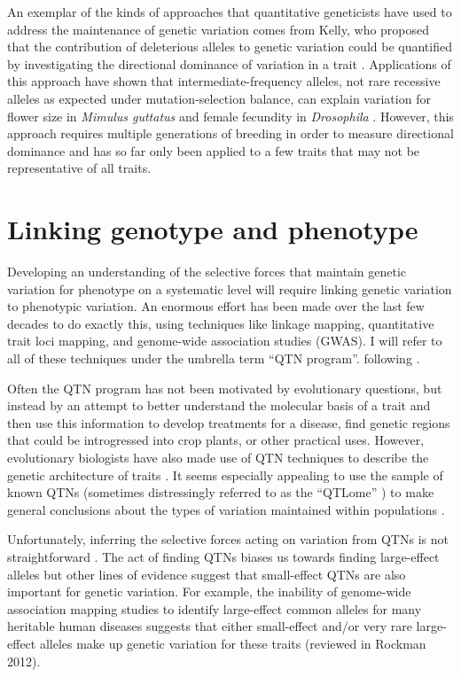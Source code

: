 An exemplar of the kinds of approaches that quantitative geneticists have used to address the maintenance of genetic variation comes from Kelly, who proposed that the contribution of deleterious alleles to genetic variation could be quantified by investigating the directional dominance of variation in a trait \citep{Kelly1999-re}. Applications of this approach have shown that intermediate-frequency alleles, not rare recessive alleles as expected under mutation-selection balance, can explain variation for flower size in \textit{Mimulus guttatus} and female fecundity in \textit{Drosophila} \citep{Kelly2001-rc,Charlesworth2007-rp}. However, this approach requires multiple generations of breeding in order to measure directional dominance and has so far only been applied to a few traits that may not be representative of all traits. 

\section{Linking genotype and phenotype}
Developing an understanding of the selective forces that maintain genetic variation for phenotype on a systematic level will require linking genetic variation to phenotypic variation. An enormous effort has been made over the last few decades to do exactly this, using techniques like linkage mapping, quantitative trait loci mapping, and genome-wide association studies (GWAS). I will refer to all of these techniques under the umbrella term “QTN program”. following \citet{Rockman2012-ks}.

Often the QTN program has not been motivated by evolutionary questions, but instead by an attempt to better understand the molecular basis of a trait and then use this information to develop treatments for a disease, find genetic regions that could be introgressed into crop plants, or other practical uses. However, evolutionary biologists have also made use of QTN techniques to describe the genetic architecture of traits \citep{lynch1998}. It seems especially appealing to use the sample of known QTNs (sometimes distressingly referred to as the “QTLome” \citep{Martinez_undated-wg}) to make general conclusions about the types of variation maintained within populations \citep{Barton2002-do}.

Unfortunately, inferring the selective forces acting on variation from QTNs is not straightforward \citep{Rockman2012-ks,Johnson2005-dl}. The act of finding QTNs biases us towards finding large-effect alleles but other lines of evidence suggest that small-effect QTNs are also important for genetic variation. For example, the inability of genome-wide association mapping studies to identify large-effect common alleles for many heritable human diseases suggests that either small-effect and/or very rare large-effect alleles make up genetic variation for these traits (reviewed in Rockman 2012). 

